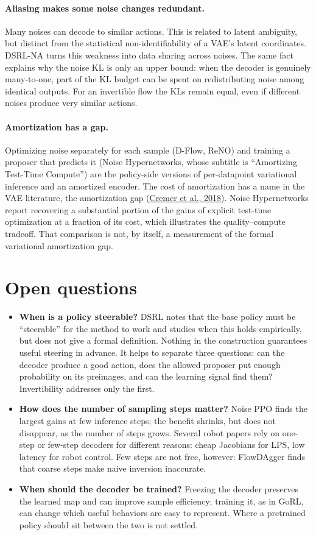 \paragraph{Aliasing makes some noise changes redundant.} Many noises can decode to similar actions. This is related to latent ambiguity, but distinct from the statistical non-identifiability of a VAE's latent coordinates. DSRL-NA turns this weakness into data sharing across noises. The same fact explains why the noise KL is only an upper bound: when the decoder is genuinely many-to-one, part of the KL budget can be spent on redistributing noise among identical outputs. For an invertible flow the KLs remain equal, even if different noises produce very similar actions.

\paragraph{Amortization has a gap.} Optimizing noise separately for each sample (D-Flow, ReNO) and training a proposer that predicts it (Noise Hypernetworks, whose subtitle is ``Amortizing Test-Time Compute'') are the policy-side versions of per-datapoint variational inference and an amortized encoder. The cost of amortization has a name in the VAE literature, the amortization gap (\hyperlink{ref:23}{Cremer et al., 2018}). Noise Hypernetworks report recovering a substantial portion of the gains of explicit test-time optimization at a fraction of its cost, which illustrates the quality--compute tradeoff. That comparison is not, by itself, a measurement of the formal variational amortization gap.

\section{Open questions}
\label{sec:7}
\begin{itemize}
\item \textbf{When is a policy steerable?} DSRL notes that the base policy must be ``steerable'' for the method to work and studies when this holds empirically, but does not give a formal definition. Nothing in the construction guarantees useful steering in advance. It helps to separate three questions: can the decoder produce a good action, does the allowed proposer put enough probability on its preimages, and can the learning signal find them? Invertibility addresses only the first.
\item \textbf{How does the number of sampling steps matter?} Noise PPO finds the largest gains at few inference steps; the benefit shrinks, but does not disappear, as the number of steps grows. Several robot papers rely on one-step or few-step decoders for different reasons: cheap Jacobians for LPS, low latency for robot control. Few steps are not free, however: FlowDAgger finds that coarse steps make naive inversion inaccurate.
\item \textbf{When should the decoder be trained?} Freezing the decoder preserves the learned map and can improve sample efficiency; training it, as in GoRL, can change which useful behaviors are easy to represent. Where a pretrained policy should sit between the two is not settled.
\end{itemize}

